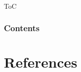 \documentclass[8pt, compress, aspectratio=169]{beamer}
\begin{document}

    \begin{frame}
        \titlepage
    \end{frame} %


    \begin{frame}{ToC}
        \frametitle{Contents}
        \tableofcontents[hideallsubsections]
    \end{frame}




    \section*{References}
    \begin{frame}[allowframebreaks]
        \nocite{*}
        \printbibliography
    \end{frame}
\end{document}
